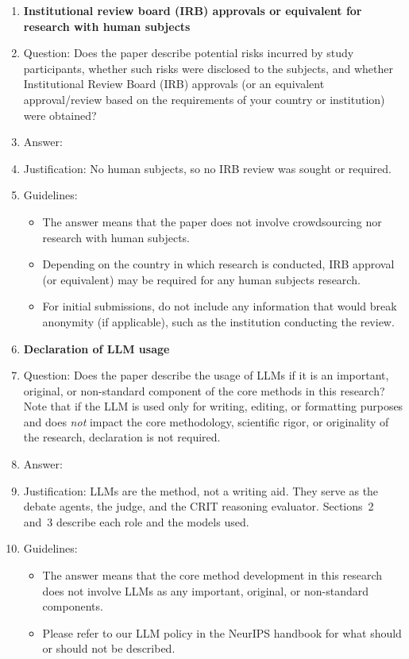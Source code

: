\begin{enumerate}
\item {\bf Institutional review board (IRB) approvals or equivalent for research with human subjects}
    \item[] Question: Does the paper describe potential risks incurred by study participants, whether such risks were disclosed to the subjects, and whether Institutional Review Board (IRB) approvals (or an equivalent approval/review based on the requirements of your country or institution) were obtained?
    \item[] Answer: \answerNA{}
    \item[] Justification: No human subjects, so no IRB review was sought or required.
    \item[] Guidelines:
    \begin{itemize}
        \item The answer \answerNA{} means that the paper does not involve crowdsourcing nor research with human subjects.
        \item Depending on the country in which research is conducted, IRB approval (or equivalent) may be required for any human subjects research.
        \item For initial submissions, do not include any information that would break anonymity (if applicable), such as the institution conducting the review.
    \end{itemize}

\item {\bf Declaration of LLM usage}
    \item[] Question: Does the paper describe the usage of LLMs if it is an important, original, or non-standard component of the core methods in this research? Note that if the LLM is used only for writing, editing, or formatting purposes and does \emph{not} impact the core methodology, scientific rigor, or originality of the research, declaration is not required.
    \item[] Answer: \answerYes{}
    \item[] Justification: LLMs are the method, not a writing aid. They serve as the debate agents, the judge, and the CRIT reasoning evaluator. Sections~2 and~3 describe each role and the models used.
    \item[] Guidelines:
    \begin{itemize}
        \item The answer \answerNA{} means that the core method development in this research does not involve LLMs as any important, original, or non-standard components.
        \item Please refer to our LLM policy in the NeurIPS handbook for what should or should not be described.
    \end{itemize}

\end{enumerate}

